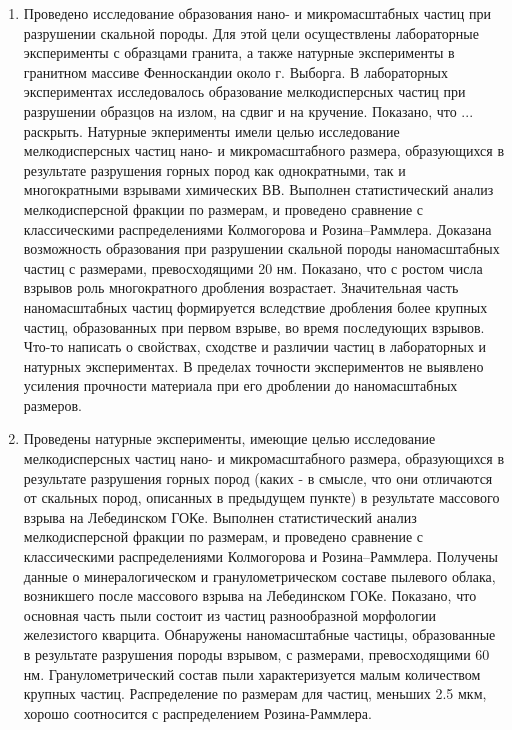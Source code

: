 \begin{enumerate}
  \item Проведено исследование образования нано- и микромасштабных частиц при разрушении скальной породы. Для этой цели осуществлены лабораторные эксперименты с образцами гранита, а также натурные эксперименты в гранитном массиве Фенноскандии около г. Выборга. В лабораторных экспериментах исследовалось образование мелкодисперсных частиц при разрушении образцов на излом, на сдвиг и на кручение. Показано, что ... раскрыть. Натурные экперименты имели целью исследование мелкодисперсных частиц нано- и микромасштабного размера, образующихся в результате разрушения горных пород как однократными, так и многократными взрывами химических ВВ. Выполнен статистический анализ мелкодисперсной фракции по размерам, и проведено сравнение с классическими распределениями Колмогорова и Розина–Раммлера. Доказана возможность образования при разрушении скальной породы наномасштабных частиц с размерами, превосходящими 20 нм. Показано, что с ростом числа взрывов роль многократного дробления возрастает. Значительная часть наномасштабных частиц формируется вследствие дробления более крупных частиц, образованных при первом взрыве, во время последующих взрывов. Что-то написать о свойствах, сходстве и различии частиц в лабораторных и натурных экспериментах. В пределах точности экспериментов не выявлено усиления прочности материала при его дроблении до наномасштабных размеров.
  \item Проведены натурные эксперименты, имеющие целью исследование мелкодисперсных частиц нано- и микромасштабного размера, образующихся в результате разрушения горных пород (каких - в смысле, что они отличаются от скальных пород, описанных в предыдущем пункте) в результате массового взрыва на Лебединском ГОКе. Выполнен статистический анализ мелкодисперсной фракции по размерам, и проведено сравнение с классическими распределениями Колмогорова и Розина–Раммлера. Получены данные о минералогическом и гранулометрическом составе пылевого облака, возникшего после массового взрыва на Лебединском ГОКе. Показано, что основная часть пыли состоит из частиц разнообразной морфологии железистого кварцита. Обнаружены наномасштабные частицы, образованные в результате разрушения породы взрывом, с размерами, превосходящими 60 нм. Гранулометрический состав пыли характеризуется малым количеством крупных частиц. Распределение по размерам для частиц, меньших 2.5 мкм, хорошо соотносится с распределением Розина-Раммлера. 
\end{enumerate}


\clearpage
